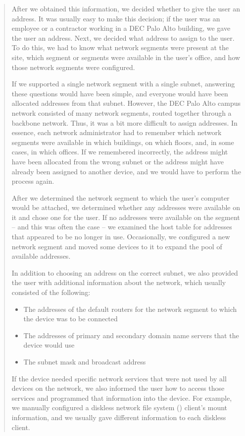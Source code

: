 {\begin{quotation}
After we obtained this information, we decided whether to give the user an  address.
It was usually easy to make this decision; if the user was an employee or a contractor working in a DEC Palo Alto building, we gave the user an address.
Next, we decided what  address to assign to the user.
To do this, we had to know what network segments were present at the site, which segment or segments were available in the user's office, and how those network segments were configured.

If we supported a single network segment with a single  subnet, answering these questions would have been simple, and everyone would have been allocated addresses from that subnet.
However, the DEC Palo Alto campus network consisted of many network segments, routed together through a backbone network.
Thus, it was a bit more difficult to assign  addresses.
In essence, each network administrator had to remember which network segments were available in which buildings, on which floors, and, in some cases, in which offices.
If we remembered incorrectly, the address might have been allocated from the wrong subnet or the address might have already been assigned to another device, and we would have to perform the process again.

After we determined the network segment to which the user's computer would be attached, we determined whether any  addresses were available on it and chose one for the user.
If no  addresses were available on the segment -- and this was often the case -- we examined the host table for addresses that appeared to be no longer in use.
Occasionally, we configured a new network segment and moved some devices to it to expand the pool of available addresses.

In addition to choosing an  address on the correct subnet, we also provided the user with additional information about the network, which usually consisted of the following:
\begin{itemize}
\item The addresses of the default routers for the network segment to which the device was to be connected
\item The addresses of primary and secondary domain name servers that the device would use
\item The subnet mask and broadcast address
\end{itemize}
If the device needed specific network services that were not used by all devices on the network, we also informed the user how to access those services and programmed that information into the device.
For example, we manually configured a diskless network file system () client's  mount information, and we usually gave different information to each diskless  client.

\end{quotation}
}